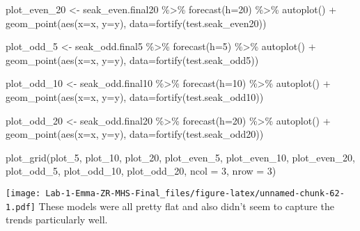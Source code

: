 \documentclass[
]{article}
\newenvironment{Shaded}{\begin{snugshade}}{\end{snugshade}}
\newcommand{\AttributeTok}[1]{\textcolor[rgb]{0.77,0.63,0.00}{#1}}
\newcommand{\DecValTok}[1]{\textcolor[rgb]{0.00,0.00,0.81}{#1}}
\newcommand{\FunctionTok}[1]{\textcolor[rgb]{0.00,0.00,0.00}{#1}}
\newcommand{\NormalTok}[1]{#1}
\newcommand{\OtherTok}[1]{\textcolor[rgb]{0.56,0.35,0.01}{#1}}
\newcommand{\SpecialCharTok}[1]{\textcolor[rgb]{0.00,0.00,0.00}{#1}}
\begin{document}
\begin{Shaded}
\begin{Highlighting}[]
\NormalTok{plot\_even\_20 }\OtherTok{\textless{}{-}}\NormalTok{ seak\_even.final20 }\SpecialCharTok{\%\textgreater{}\%}
  \FunctionTok{forecast}\NormalTok{(}\AttributeTok{h=}\DecValTok{20}\NormalTok{) }\SpecialCharTok{\%\textgreater{}\%}
  \FunctionTok{autoplot}\NormalTok{() }\SpecialCharTok{+} \FunctionTok{geom\_point}\NormalTok{(}\FunctionTok{aes}\NormalTok{(}\AttributeTok{x=}\NormalTok{x, }\AttributeTok{y=}\NormalTok{y), }\AttributeTok{data=}\FunctionTok{fortify}\NormalTok{(test.seak\_even20))}

\NormalTok{plot\_odd\_5 }\OtherTok{\textless{}{-}}\NormalTok{ seak\_odd.final5 }\SpecialCharTok{\%\textgreater{}\%}
  \FunctionTok{forecast}\NormalTok{(}\AttributeTok{h=}\DecValTok{5}\NormalTok{) }\SpecialCharTok{\%\textgreater{}\%}
  \FunctionTok{autoplot}\NormalTok{() }\SpecialCharTok{+} \FunctionTok{geom\_point}\NormalTok{(}\FunctionTok{aes}\NormalTok{(}\AttributeTok{x=}\NormalTok{x, }\AttributeTok{y=}\NormalTok{y), }\AttributeTok{data=}\FunctionTok{fortify}\NormalTok{(test.seak\_odd5))}

\NormalTok{plot\_odd\_10 }\OtherTok{\textless{}{-}}\NormalTok{ seak\_odd.final10 }\SpecialCharTok{\%\textgreater{}\%}
  \FunctionTok{forecast}\NormalTok{(}\AttributeTok{h=}\DecValTok{10}\NormalTok{) }\SpecialCharTok{\%\textgreater{}\%}
  \FunctionTok{autoplot}\NormalTok{() }\SpecialCharTok{+} \FunctionTok{geom\_point}\NormalTok{(}\FunctionTok{aes}\NormalTok{(}\AttributeTok{x=}\NormalTok{x, }\AttributeTok{y=}\NormalTok{y), }\AttributeTok{data=}\FunctionTok{fortify}\NormalTok{(test.seak\_odd10))}

\NormalTok{plot\_odd\_20 }\OtherTok{\textless{}{-}}\NormalTok{ seak\_odd.final20 }\SpecialCharTok{\%\textgreater{}\%}
  \FunctionTok{forecast}\NormalTok{(}\AttributeTok{h=}\DecValTok{20}\NormalTok{) }\SpecialCharTok{\%\textgreater{}\%}
  \FunctionTok{autoplot}\NormalTok{() }\SpecialCharTok{+} \FunctionTok{geom\_point}\NormalTok{(}\FunctionTok{aes}\NormalTok{(}\AttributeTok{x=}\NormalTok{x, }\AttributeTok{y=}\NormalTok{y), }\AttributeTok{data=}\FunctionTok{fortify}\NormalTok{(test.seak\_odd20))}

\FunctionTok{plot\_grid}\NormalTok{(plot\_5, plot\_10, plot\_20, plot\_even\_5, plot\_even\_10, plot\_even\_20, plot\_odd\_5, plot\_odd\_10, plot\_odd\_20, }\AttributeTok{ncol =} \DecValTok{3}\NormalTok{, }\AttributeTok{nrow =} \DecValTok{3}\NormalTok{)}
\end{Highlighting}
\end{Shaded}

\texttt{[image: Lab-1-Emma-ZR-MHS-Final\_files/figure-latex/unnamed-chunk-62-1.pdf]}
These models were all pretty flat and also didn't seem to capture the
trends particularly well.
\end{document}
